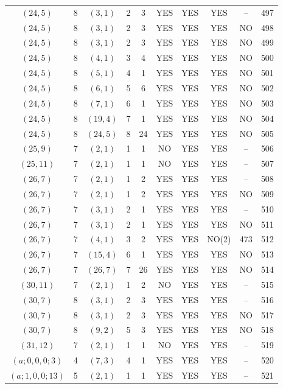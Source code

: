 \begin{longtable}{|c|c|c|c|c|c|c|c|c|c|}
$(24, 5)$ & 8 & $(3, 1)$ & 2 & 3 & YES & YES & YES & -- & 497\\
$(24, 5)$ & 8 & $(3, 1)$ & 2 & 3 & YES & YES & YES & NO & 498\\
$(24, 5)$ & 8 & $(3, 1)$ & 2 & 3 & YES & YES & YES & NO & 499\\
$(24, 5)$ & 8 & $(4, 1)$ & 3 & 4 & YES & YES & YES & NO & 500\\
$(24, 5)$ & 8 & $(5, 1)$ & 4 & 1 & YES & YES & YES & NO & 501\\
$(24, 5)$ & 8 & $(6, 1)$ & 5 & 6 & YES & YES & YES & NO & 502\\
$(24, 5)$ & 8 & $(7, 1)$ & 6 & 1 & YES & YES & YES & NO & 503\\
$(24, 5)$ & 8 & $(19, 4)$ & 7 & 1 & YES & YES & YES & NO & 504\\
$(24, 5)$ & 8 & $(24, 5)$ & 8 & 24 & YES & YES & YES & NO & 505\\
$(25, 9)$ & 7 & $(2, 1)$ & 1 & 1 & NO & YES & YES & -- & 506\\
$(25, 11)$ & 7 & $(2, 1)$ & 1 & 1 & NO & YES & YES & -- & 507\\
$(26, 7)$ & 7 & $(2, 1)$ & 1 & 2 & YES & YES & YES & -- & 508\\
$(26, 7)$ & 7 & $(2, 1)$ & 1 & 2 & YES & YES & YES & NO & 509\\
$(26, 7)$ & 7 & $(3, 1)$ & 2 & 1 & YES & YES & YES & -- & 510\\
$(26, 7)$ & 7 & $(3, 1)$ & 2 & 1 & YES & YES & YES & NO & 511\\
$(26, 7)$ & 7 & $(4, 1)$ & 3 & 2 & YES & YES & NO(2) & 473 & 512\\
$(26, 7)$ & 7 & $(15, 4)$ & 6 & 1 & YES & YES & YES & NO & 513\\
$(26, 7)$ & 7 & $(26, 7)$ & 7 & 26 & YES & YES & YES & NO & 514\\
$(30, 11)$ & 7 & $(2, 1)$ & 1 & 2 & NO & YES & YES & -- & 515\\
$(30, 7)$ & 8 & $(3, 1)$ & 2 & 3 & YES & YES & YES & -- & 516\\
$(30, 7)$ & 8 & $(3, 1)$ & 2 & 3 & YES & YES & YES & NO & 517\\
$(30, 7)$ & 8 & $(9, 2)$ & 5 & 3 & YES & YES & YES & NO & 518\\
$(31, 12)$ & 7 & $(2, 1)$ & 1 & 1 & NO & YES & YES & -- & 519\\
$(a; 0, 0, 0; 3)$ & 4 & $(7, 3)$ & 4 & 1 & YES & YES & YES & -- & 520\\
$(a; 1, 0, 0; 13)$ & 5 & $(2, 1)$ & 1 & 1 & YES & YES & YES & -- & 521\\

\end{longtable}
